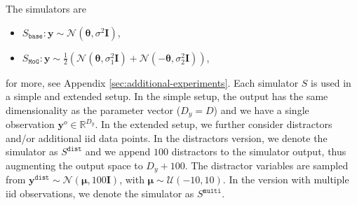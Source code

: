 \documentclass[twoside]{article}
\newcommand{\thb}{\boldsymbol{\theta}}
\newcommand{\yb}{\mathbf{y}}
\newcommand{\data}{\mathbf{y}^o}
\begin{document}
The simulators are
\begin{itemize}
  \item $S_{\mathtt{base}}: \yb \sim \mathcal{N}(\thb, \sigma^2 \mathbf{I})$,
  \item $S_{\mathtt{MoG}}: \yb \sim \frac{1}{2}\left ( \mathcal{N}(\thb, \sigma_1^2 \mathbf{I}) + \mathcal{N}(-\thb, \sigma_2^2\mathbf{I})\right)$,
\end{itemize}
for more, see Appendix \ref{sec:additional-experiments}.
Each simulator $S$ is used in a simple and extended setup. In the simple setup, the output has the same dimensionality as the parameter vector ($D_y = D$) and we have a single observation $\data \in \mathbb{R}^{D_y}$. In the extended setup, we further consider distractors and/or additional iid data points. In the distractors version, we denote the simulator as $S^{\mathtt{dist}}$ and we append $100$ distractors to the simulator output, thus augmenting the output space to $D_y+100$. The distractor variables are sampled from $\yb^{\mathtt{dist}} \sim \mathcal{N}(\boldsymbol{\mu}, 100 \mathbf{I})$, with $\boldsymbol{\mu} \sim \mathcal{U}(-10, 10)$. In the version with multiple iid observations, we denote the simulator as $S^{\mathtt{multi}}$. %
\end{document}
